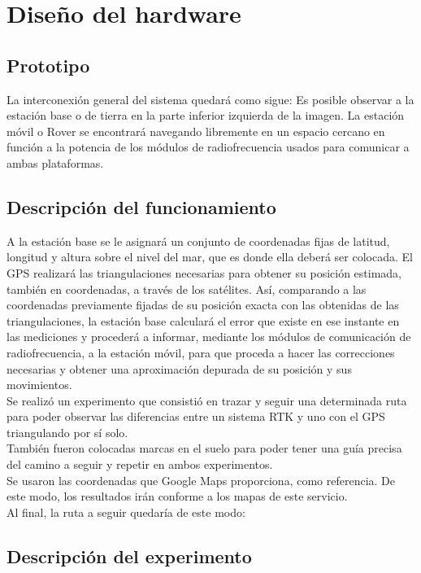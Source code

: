 
\chapter{Diseño del hardware}\label{Chap:DisHard} %


\section{Prototipo}

La interconexión general del sistema quedará como sigue: Es posible observar a la estación base o de tierra en la parte inferior izquierda de la imagen. La estación móvil o Rover se encontrará navegando libremente en un espacio cercano en función a la potencia de los módulos de radiofrecuencia usados para comunicar a ambas plataformas.

\section{Descripción del funcionamiento}

A la estación base se le asignará un conjunto de coordenadas fijas de latitud, longitud y altura sobre el nivel del mar, que es donde ella deberá ser colocada. El GPS realizará las triangulaciones necesarias para obtener su posición estimada, también en coordenadas, a través de los satélites. Así, comparando a las coordenadas previamente fijadas de su posición exacta con las obtenidas de las triangulaciones, la estación base calculará el
error que existe en ese instante en las mediciones y procederá a informar, mediante los módulos de comunicación de radiofrecuencia, a la estación móvil, para que proceda a hacer las correcciones necesarias y obtener una aproximación depurada de su posición y sus movimientos. \\

Se realizó un experimento que consistió en trazar y seguir una determinada ruta para poder observar las diferencias entre un sistema RTK y uno con el GPS triangulando por sí solo. \\

También fueron colocadas marcas en el suelo para poder tener una guía precisa del camino a seguir y repetir en ambos experimentos. \\

Se usaron las coordenadas que Google Maps proporciona, como referencia. De este modo, los resultados irán conforme a los mapas de este servicio. \\

Al final, la ruta a seguir quedaría de este modo:

\section{Descripción del experimento}